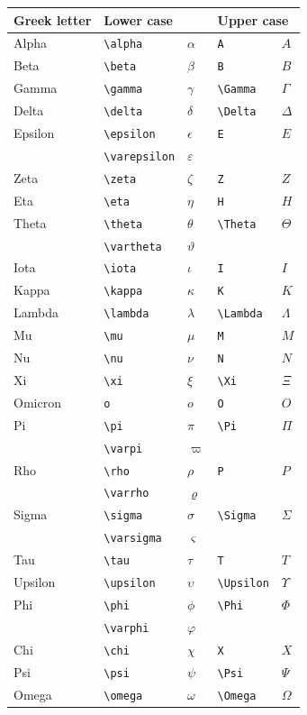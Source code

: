 \documentclass[a4paper,14pt]{extarticle}
\begin{document}
\begin{center}
\begin{tabular}{|p{}|p{}|p{}|p{}|p{}|}
\hline
Greek letter & \multicolumn{2}{l|}{Lower case} & \multicolumn{2}{l|}{Upper case} \\
\hline
Alpha & \verb=\alpha= & \(\alpha\) & \verb=A= & \(A\) \\
Beta & \verb=\beta= & \(\beta\) & \verb=B= & \(B\) \\
Gamma & \verb=\gamma= & \(\gamma\) & \verb=\Gamma= & \(\Gamma\) \\
Delta & \verb=\delta= & \(\delta\) & \verb=\Delta= & \(\Delta\) \\
Epsilon & \verb=\epsilon= & \(\epsilon\) & \verb=E= & \(E\) \\
& \verb=\varepsilon= & \(\varepsilon\) & & \\
Zeta & \verb=\zeta= & \(\zeta\) & \verb=Z= & \(Z\) \\
Eta & \verb=\eta= & \(\eta\) & \verb=H= & \(H\) \\
Theta & \verb=\theta= & \(\theta\) & \verb=\Theta= & \(\Theta\) \\
& \verb=\vartheta= & \(\vartheta\) & & \\
Iota & \verb=\iota= & \(\iota\) & \verb=I= & \(I\) \\
Kappa & \verb=\kappa= & \(\kappa\) & \verb=K= & \(K\) \\
Lambda & \verb=\lambda= & \(\lambda\) & \verb=\Lambda= & \(\Lambda\) \\
Mu & \verb=\mu= & \(\mu\) & \verb=M= & \(M\) \\
Nu & \verb=\nu= & \(\nu\) & \verb=N= & \(N\) \\
Xi & \verb=\xi= & \(\xi\) & \verb=\Xi= & \(\Xi\) \\
Omicron & \verb=o= & \(o\) & \verb=O= & \(O\) \\
Pi & \verb=\pi= & \(\pi\) & \verb=\Pi= & \(\Pi\) \\
& \verb=\varpi= & \(\varpi\) & & \\
Rho & \verb=\rho= & \(\rho\) & \verb=P= & \(P\) \\
& \verb=\varrho= & \(\varrho\) & & \\
Sigma & \verb=\sigma= & \(\sigma\) & \verb=\Sigma= & \(\Sigma\) \\
& \verb=\varsigma= & \(\varsigma\) & & \\
Tau & \verb=\tau= & \(\tau\) & \verb=T= & \(T\) \\
Upsilon & \verb=\upsilon= & \(\upsilon\) & \verb=\Upsilon= & \(\Upsilon\) \\
Phi & \verb=\phi= & \(\phi\) & \verb=\Phi= & \(\Phi\) \\
& \verb=\varphi= & \(\varphi\) & & \\
Chi & \verb=\chi= & \(\chi\) & \verb=X= & \(X\) \\
Psi & \verb=\psi= & \(\psi\) & \verb=\Psi= & \(\Psi\) \\
Omega & \verb=\omega= & \(\omega\) & \verb=\Omega= & \(\Omega\)\\
\hline
\end{tabular}
\end{center}
\end{document}
